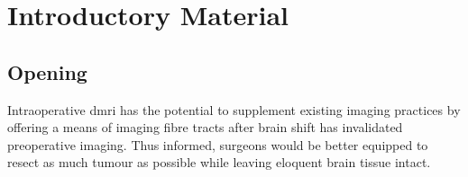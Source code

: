 \chapter{Introductory Material}
\label{chapterlabel0}

\section{Opening}


Intraoperative \gls{dmri} has the potential to supplement existing imaging practices by offering a means of imaging fibre tracts after brain shift has invalidated preoperative imaging.\autocite{Nimsky2001}
Thus informed, surgeons would be better equipped to resect as much tumour as possible while leaving eloquent brain tissue intact. 

